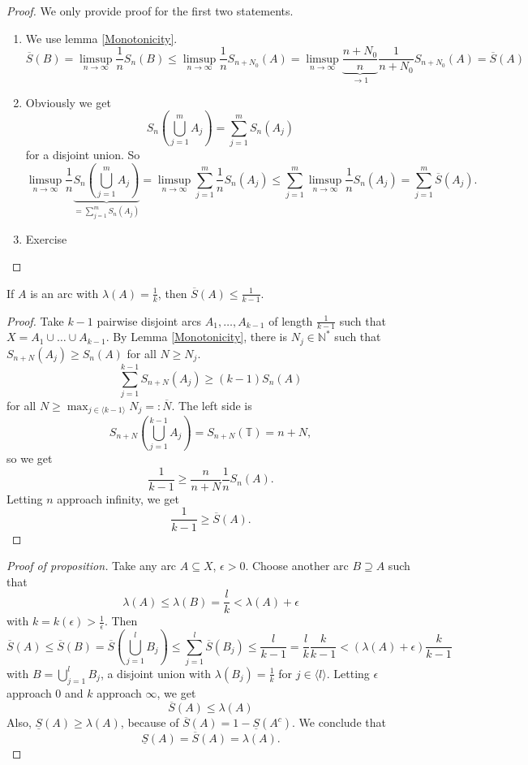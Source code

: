 \documentclass{article}
\newcommand*{\N}{\mathbb{N}}
\newcommand*{\T}{\mathbb{T}}
\newcommand*{\Ns}{\N^*}
\newcommand*{\jbr}[1]{{\langle #1 \rangle}}
\newcommand*{\reci}[1]{{\frac{1}{#1}}}
\begin{document}
\begin{proof}
    We only provide proof for the first two statements.
    \begin{enumerate}
        \item We use lemma \ref{Monotonicity}.
        $$\overline S(B)=\limsup_{n\to \infty} \reci nS_n(B) \leq \limsup_{n\to\infty}\reci n S_{n+N_0}(A) = \limsup_{n\to\infty}\underbrace{\frac{n+N_0}n}_{\to1}\reci{n+N_0} S_{n+N_0}(A) = \overline S(A)$$

        \item Obviously we get
        $$S_n\left(\bigcup_{j=1}^mA_j\right) = \sum_{j=1}^mS_n(A_j)$$
        for a disjoint union. So
        $$\limsup_{n\to\infty}\reci n\underbrace{S_n\left(\bigcup_{j=1}^mA_j\right)}_{=\sum_{j=1}^mS_n(A_j)} = \limsup_{n\to\infty}\sum_{j=1}^m\reci nS_n(A_j)\leq \sum_{j=1}^m\limsup_{n\to\infty}\reci nS_n(A_j) = \sum_{j=1}^m \overline S(A_j).$$

        \item Exercise
    \end{enumerate}
\end{proof}

\begin{lem}
    If $A$ is an arc with $\lambda(A) = \reci k$, then $\overline S(A) \leq \reci {k-1}$.
\end{lem}

\begin{proof}
    Take $k-1$ pairwise disjoint arcs $A_1,\dots,A_{k-1}$ of length $\reci{k-1}$ such that $X = A_1 \cup \dots \cup A_{k-1}$. By Lemma \ref{Monotonicity}, there is $N_j \in \Ns$ such that $S_{n+N}(A_j)\geq S_n(A)$ for all $N \geq N_j$.
    $$\sum_{j=1}^{k-1}S_{n+N}(A_j)\geq(k-1)S_n(A)$$
    for all $N \geq \max_{j\in \jbr{k-1}} N_j =: \overline N$. The left side is
    $$S_{n+N}\left(\bigcup_{j=1}^{k-1}A_j\right)=S_{n+N}(\T)=n+N,$$
    so we get
    $$\reci{k-1}\geq \frac{n}{n+N}\reci nS_n(A).$$
    Letting $n$ approach infinity, we get
    $$\reci{k-1}\geq \overline S(A).$$
\end{proof}

\begin{proof}[Proof of proposition]
    Take any arc $A\subseteq X$, $\epsilon > 0$. Choose another arc $B\supseteq A$ such that
    $$\lambda(A)\leq\lambda(B)=\frac lk<\lambda(A)+\epsilon$$
    with $k = k(\epsilon)>\reci\epsilon$. Then
    $$\overline S(A)\leq\overline S(B)=\overline S\left(\bigcup_{j=1}^lB_j\right)\leq \sum_{j=1}^l\overline S(B_j) \leq \frac l{k-1}=\frac lk\frac{k}{k-1} < (\lambda(A)+\epsilon)\frac k{k-1}$$
    with $B=\bigcup_{j=1}^l B_j$, a disjoint union with $\lambda(B_j)=\reci k$ for $j \in\jbr{l}$. Letting $\epsilon$ approach $0$ and $k$ approach $\infty$, we get
    $$\overline S(A)\leq \lambda(A)$$
    Also, $\underline S(A)\geq \lambda(A)$, because of $\overline S(A)=1-\underline S(A^c)$. We conclude that
    $$\underline S(A) = \overline S(A) = \lambda(A).$$
\end{proof}
\end{document}
